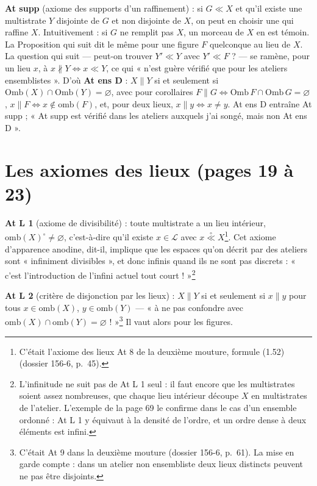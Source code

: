 \documentclass[11pt,a4paper]{article}
\begin{document}
\textbf{At supp} (axiome des supports d'un raffinement) : si $G \ll X$ et qu'il
existe une multistrate $Y$ disjointe de $G$ et non disjointe de $X$, on peut en
choisir une qui raffine $X$. Intuitivement : si $G$ ne remplit pas $X$, un
morceau de $X$ en est témoin. La Proposition qui suit dit le même pour une figure $F$
quelconque au lieu de $X$. La question qui suit --- peut-on trouver $Y' \ll Y$
avec $Y' \ll F$ ? --- se ramène, pour un lieu $x$, à $x \nparallel Y \iff x \ll
Y$, ce qui « n'est guère vérifié que pour les ateliers ensemblistes ». D'où
\textbf{At ens D} : $X \parallel Y$ si et seulement si $\mathrm{Omb}(X) \cap
\mathrm{Omb}(Y) = \varnothing$, avec pour corollaires $F \parallel G \iff
\mathrm{Omb}\, F \cap \mathrm{Omb}\, G = \varnothing$, $x \parallel F \iff x
\notin \mathrm{omb}(F)$, et, pour deux lieux, $x \parallel y \iff x \neq y$. At
ens D entraîne At supp ; « At supp est vérifié dans les ateliers auxquels j'ai
songé, mais non At ens D ».

\section*{Les axiomes des lieux (pages 19 à 23)}

\textbf{At L 1} (axiome de divisibilité) : toute multistrate a un lieu
intérieur, $\mathrm{omb}(X)^{\circ} \neq \varnothing$, c'est-à-dire qu'il existe
$x \in \mathcal{L}$ avec $x \mathrel{\overset{\circ}{\ll}} X$\footnote{C'était
l'axiome des lieux At 8 de la deuxième mouture, formule (1.52) (dossier 156-6,
p.~45).}. Cet axiome d'apparence anodine, dit-il, implique que les espaces
qu'on décrit par des ateliers sont « infiniment divisibles », et donc infinis
quand ils ne sont pas discrets : « c'est l'introduction de l'infini actuel tout
court ! »\footnote{L'infinitude ne suit pas de At L 1 seul : il faut encore que
les multistrates soient assez nombreuses, que chaque lieu intérieur découpe $X$
en multistrates de l'atelier. L'exemple de la page 69 le confirme dans le cas
d'un ensemble ordonné : At L 1 y équivaut à la densité de l'ordre, et un ordre
dense à deux éléments est infini.}

\textbf{At L 2} (critère de disjonction par les lieux) : $X \parallel Y$ si et
seulement si $x \parallel y$ pour tous $x \in \mathrm{omb}(X)$, $y \in
\mathrm{omb}(Y)$ --- « à ne pas confondre avec $\mathrm{omb}(X) \cap
\mathrm{omb}(Y) = \varnothing$ ! »\footnote{C'était At 9 dans la deuxième
mouture (dossier 156-6, p.~61). La mise en garde compte : dans un atelier non
ensembliste deux lieux distincts peuvent ne pas être disjoints.} Il vaut alors
pour les figures.
\end{document}
